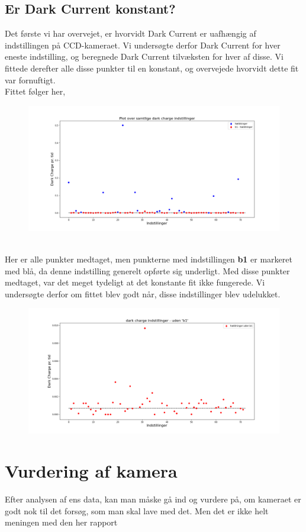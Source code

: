 \documentclass[working]{tuftebook}
\begin{document}
\subsection{Er Dark Current konstant?}
Det første vi har overvejet, er hvorvidt Dark Current er uafhængig af indstillingen på CCD-kameraet. Vi undersøgte derfor Dark Current for hver eneste indstilling, og beregnede Dark Current tilvæksten for hver af disse. Vi fittede derefter alle disse punkter til en konstant, og overvejede hvorvidt dette fit var fornuftigt.
\\
Fittet følger her,
\begin{figure}[ht]
	\centering
	\includegraphics[width = \textwidth]{../Plots/dark_hældninger_1.png}
\end{figure}
\\
Her er alle punkter medtaget, men punkterne med indstillingen \textbf{b1} er markeret med blå, da denne indstilling generelt opførte sig underligt. Med disse punkter medtaget, var det meget tydeligt at det konstante fit ikke fungerede. Vi undersøgte derfor om fittet blev godt når, disse indstillinger blev udelukket.
\begin{figure}[ht]
	\centering
	\includegraphics[width = \textwidth]{../Plots/dark_hældninger_2.png}
\end{figure}
\section{Vurdering af kamera}
Efter analysen af ens data, kan man måske gå ind og vurdere på, om kameraet er godt nok til det forsøg, som man skal lave med det. Men det er ikke helt meningen med den her rapport
\end{document}
